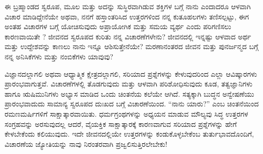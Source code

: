 

\newpage
\begin{mananam}{}
\nfntmtxt ಈ ಬ್ರಹ್ಮಾಂಡದ ಸ್ವರೂಪ, ಮೂಲ ಮತ್ತು ಅದನ್ನು ಸುಸ್ಥಿರವಾಗಿಡುವ ಶಕ್ತಿಗಳ ಬಗ್ಗೆ ನಾನು ಎಂದಾದರೂ ಆಳವಾಗಿ ವಿಚಾರ ಮಾಡಿದ್ದೇನೆಯೇ  ಅಥವಾ, ನನಗೆ ಹಸ್ತಾಂತರಿಸಿದ  ಉತ್ತರಗಳಿಂದ  ನನ್ನ ಕುತೂಹಲಗಳು ತಣಿಸಲ್ಪಟ್ಟು, ಈಗ ಅಂತಹ ವಿಚಾರಗಳ ಬಗ್ಗೆ ಯೋಚಿಸುವುದು ಅಪ್ರಾಯೋಗಿಕ  ಮತ್ತು ಸಮಯ ವ್ಯರ್ಥ ಎಂದು  ಪರಿಗಣಿಸಲು ಕಾರಣವಾಯಿತೇ ? 
ಜೀವನದ ಸ್ವರೂಪದ ಕುರಿತು ನನ್ನ ವಿಚಾರಣೆಗಳೇನು? ಜೀವನದಲ್ಲಿ ಇನ್ನಷ್ಟು ಆಳವಾದ ಅರ್ಥ ಮತ್ತು ಉದ್ದೇಶವನ್ನು ಕಾಣಲು ನಾನು ಇನ್ನೂ ಆಶಿಸುತ್ತೇನೆಯೇ? ಮರಣಾನಂತರದ ಜೀವನ ಮತ್ತು ಪುನರ್ಜನ್ಮದ ಬಗ್ಗೆ ನನ್ನ ಅನಿಸಿಕೆಗಳು ಮತ್ತು ನಂಬಿಕೆಗಳು ಯಾವುವು?
\end{mananam}
\sReflect
\begin{inspiration}{}
\nfntmtxt ವಿಜ್ಞಾನದಲ್ಲಾಗಲಿ  ಅಥವಾ ಆಧ್ಯಾತ್ಮಿಕ ಕ್ಷೇತ್ರದಲ್ಲಾಗಲಿ, ಸರಿಯಾದ ಪ್ರಶ್ನೆಗಳನ್ನು ಕೇಳುವುದರಿಂದ ಎಲ್ಲಾ ಆವಿಷ್ಕಾರಗಳು ಪ್ರಾರಂಭವಾಗುತ್ತವೆ. ವಿಚಾರಣೆಗಳಲ್ಲಿ ತೊಡಗುವುದು ಮತ್ತು ಆಳವಾಗಿ ಪರಿಶೋಧಿಸುವುದು ಕೂಡ, ತತ್ವಜ್ಞಾನಿಗಳು ಹಾಗೂ ಋಷಿಮುನಿಗಳು ಅಭ್ಯಾಸ ಮಾಡಿದ ಒಂದು ಚಿಂತನೆಯ ಕಲೆಯೇ ಆಗಿದೆ. ಸತ್ಯಕ್ಕಾಗಿ ಬುದ್ಧನ ಅನ್ವೇಷಣೆಯು ಪ್ರಾರಂಭವಾದುದು ಸಾಮಾನ್ಯ ಸ್ವರೂಪದ ದುಃಖದ ಬಗ್ಗೆ ವಿಚಾರಣೆಯಿಂದ.  “ನಾನು ಯಾರು?” ಎಂಬ ಚಿಂತನೆಯಿಂದ ರಮಣಮರ್ಷಿಗಳಿಗೆ ಸಾಕ್ಷಾತ್ಕಾರವಾಯಿತು. 
ಧರ್ಮಗ್ರಂಥಗಳನ್ನು ಅಧ್ಯಯನ ಮಾಡುವ ಮೌಲ್ಯವು ಸಿದ್ಧ ಉತ್ತರಗಳ ಸಂಗ್ರಹವನ್ನು ಅರಸುವುದಲ್ಲ ಆದರೆ, ವೈಯಕ್ತಿಕ ಸಾಕ್ಷಾತ್ಕಾರಕ್ಕೆ ಕಾರಣವಾಗುವ ಸರಿಯಾದ ಪ್ರಶ್ನೆಗಳನ್ನು ಹೇಗೆ ಕೇಳಬೇಕೆಂದು ಕಲಿಯುವುದು. ಇದೇ ಜೀವನದಲ್ಲಿಯೇ ಉತ್ತರಗಳನ್ನು ಕಂಡುಕೊಳ್ಳಬೇಕೆಂಬ ತುರ್ತುಭಾವದೊಂದಿಗೆ, ವಿಚಾರಣೆಯ ಜ್ಯೋತಿಯನ್ನು ನಾವು ನಿರಂತರವಾಗಿ ಪ್ರಜ್ವಲಿಸುತ್ತಿರಲೇಬೇಕು!
\end{inspiration}
\newpage

